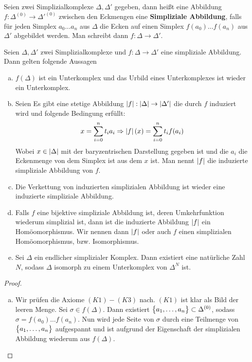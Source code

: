 
\begin{Def} 
  Seien zwei Simplizialkomplexe $\Delta, \Delta'$ gegeben, dann heißt
  eine Abbildung $f: \Delta^{(0)} \rightarrow \Delta'^{(0)}$ zwischen
  den Eckmengen eine \textbf{Simpliziale Abbildung}, falls für jeden
  Simplex $a_0 \ldots a_n$ aus $\Delta$ die Ecken auf einen Simplex
  $f(a_0) \ldots f(a_n)$ aus $\Delta'$ abgebildet werden. Man schreibt
  dann $f: \Delta \rightarrow \Delta'$.
\end{Def}

\begin{Satz} \label{satz:geosimp} Seien $\Delta, \Delta'$ zwei
  Simplizialkomplexe und $f: \Delta \rightarrow \Delta'$ eine
  simpliziale Abbildung. Dann gelten folgende Aussagen
	\begin{enumerate}[(a)]
        \item $f(\Delta)$ ist ein Unterkomplex und das Urbild eines
          Unterkomplexes ist wieder ein Unterkomplex.
        \item Seien Es gibt eine stetige Abbildung
          $\left| f \right| : \left| \Delta \right| \rightarrow \left| \Delta' \right|$ die durch
          $f$ induziert wird und folgende Bedingung erfüllt:
          \begin{gather*}
            x = \sum\limits_{i=0}^{n} t_i a_i \Rightarrow \left| f \right|(x) = \sum\limits_{i=0}^{n}
            t_i f(a_i)
          \end{gather*}
          Wobei $x \in \left| \Delta \right|$ mit der baryzentrischen
          Darstellung gegeben ist und die $a_i$ die Eckenmenge von dem
          Simplex ist aus dem $x$ ist.  Man nennt $\left| f \right|$ die
          induzierte simpliziale Abbildung von $f$.
        \item Die Verkettung von induzierten simplizialen Abbildung
          ist wieder eine induzierte simpliziale Abbildung.
        \item Falls $f$ eine bijektive simpliziale Abbildung ist,
          deren Umkehrfunktion wiederum simplizial ist, dann ist die
          induzierte Abbildung $\left| f \right|$ ein Homöomorphismus. Wir
          nennen dann $\left| f \right|$ oder auch $f$ einen simplizialen
          Homöomorphismus, bzw. Isomorphismus.
        \item Sei $\Delta$ ein endlicher simplizialer Komplex. Dann
          existiert eine natürliche Zahl $N$, sodass $\Delta$
          isomorph zu einem Unterkomplex von $\Delta^N$ ist.
	\end{enumerate}
	\begin{proof}
          \begin{enumerate}[(a)]
          \item Wir prüfen die Axiome $(K1)-(K3)$ nach. $(K1)$ ist
            klar als Bild der leeren Menge. Sei
            $\sigma \in f(\Delta)$. Dann existiert
            $\bigl\{ a_1 , \ldots , a_n \bigr\} \subset \Delta^{(0)}$, sodass
            $\sigma = f(a_0)\ldots f(a_n)$. Nun wird jede Seite von
            $\sigma$ durch eine Teilmenge von
            $\bigl\{ a_1 ,\ldots , a_n \bigr\}$ aufgespannt und ist aufgrund
            der Eigenschaft der simplizialen Abbildung wiederum aus
            $f(\Delta)$.


\end{enumerate}
\end{proof}
\end{Satz}
